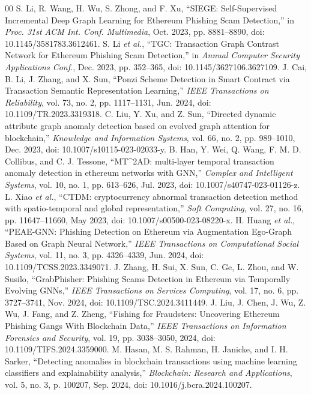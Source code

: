 \documentclass{ieeeaccess}
\begin{document}
\begin{thebibliography}{00}
 S. Li, R. Wang, H. Wu, S. Zhong, and F. Xu, ``SIEGE: Self-Supervised Incremental Deep Graph Learning for Ethereum Phishing Scam Detection,'' in \emph{Proc. 31st ACM Int. Conf. Multimedia}, Oct. 2023, pp. 8881--8890, doi: 10.1145/3581783.3612461.
 S. Li \emph{et al.}, ``TGC: Transaction Graph Contrast Network for Ethereum Phishing Scam Detection,'' in \emph{Annual Computer Security Applications Conf.}, Dec. 2023, pp. 352--365, doi: 10.1145/3627106.3627109.
 J. Cai, B. Li, J. Zhang, and X. Sun, ``Ponzi Scheme Detection in Smart Contract via Transaction Semantic Representation Learning,'' \emph{IEEE Transactions on Reliability}, vol. 73, no. 2, pp. 1117--1131, Jun. 2024, doi: 10.1109/TR.2023.3319318.
 C. Liu, Y. Xu, and Z. Sun, ``Directed dynamic attribute graph anomaly detection based on evolved graph attention for blockchain,'' \emph{Knowledge and Information Systems}, vol. 66, no. 2, pp. 989--1010, Dec. 2023, doi: 10.1007/s10115-023-02033-y.
 B. Han, Y. Wei, Q. Wang, F. M. D. Collibus, and C. J. Tessone, ``MT\textasciicircum2AD: multi-layer temporal transaction anomaly detection in ethereum networks with GNN,'' \emph{Complex and Intelligent Systems}, vol. 10, no. 1, pp. 613--626, Jul. 2023, doi: 10.1007/s40747-023-01126-z.
 L. Xiao \emph{et al.}, ``CTDM: cryptocurrency abnormal transaction detection method with spatio-temporal and global representation,'' \emph{Soft Computing}, vol. 27, no. 16, pp. 11647--11660, May 2023, doi: 10.1007/s00500-023-08220-x.
 H. Huang \emph{et al.}, ``PEAE-GNN: Phishing Detection on Ethereum via Augmentation Ego-Graph Based on Graph Neural Network,'' \emph{IEEE Transactions on Computational Social Systems}, vol. 11, no. 3, pp. 4326--4339, Jun. 2024, doi: 10.1109/TCSS.2023.3349071.
 J. Zhang, H. Sui, X. Sun, C. Ge, L. Zhou, and W. Susilo, ``GrabPhisher: Phishing Scams Detection in Ethereum via Temporally Evolving GNNs,'' \emph{IEEE Transactions on Services Computing}, vol. 17, no. 6, pp. 3727--3741, Nov. 2024, doi: 10.1109/TSC.2024.3411449.
 J. Liu, J. Chen, J. Wu, Z. Wu, J. Fang, and Z. Zheng, ``Fishing for Fraudsters: Uncovering Ethereum Phishing Gangs With Blockchain Data,'' \emph{IEEE Transactions on Information Forensics and Security}, vol. 19, pp. 3038--3050, 2024, doi: 10.1109/TIFS.2024.3359000.
 M. Hasan, M. S. Rahman, H. Janicke, and I. H. Sarker, ``Detecting anomalies in blockchain transactions using machine learning classifiers and explainability analysis,'' \emph{Blockchain: Research and Applications}, vol. 5, no. 3, p. 100207, Sep. 2024, doi: 10.1016/j.bcra.2024.100207.

\end{thebibliography}
\end{document}
